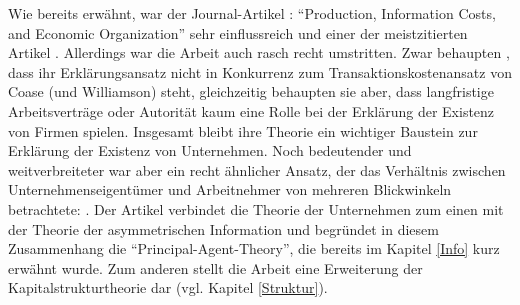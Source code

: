 Wie bereits erwähnt, war der Journal-Artikel \textcite{Alchian1972}: "`Production, Information Costs, and Economic Organization"' sehr einflussreich und einer der meistzitierten Artikel \parencite[S. 192]{Kim2006}. Allerdings war die Arbeit auch rasch recht umstritten. Zwar behaupten \textcite[S. 783]{Alchian1972}, dass ihr Erklärungsansatz nicht in Konkurrenz zum Transaktionskostenansatz von Coase (und Williamson) steht, gleichzeitig behaupten sie aber, dass langfristige Arbeitsverträge \parencite[S. 784]{Alchian1972} oder Autorität kaum eine Rolle bei der Erklärung der Existenz von Firmen spielen. Insgesamt bleibt ihre Theorie ein wichtiger Baustein zur Erklärung der Existenz von Unternehmen. Noch bedeutender und weitverbreiteter war aber ein recht ähnlicher Ansatz, der das Verhältnis zwischen Unternehmenseigentümer und Arbeitnehmer von mehreren Blickwinkeln betrachtete: \textcite{Jensen1976}. Der Artikel verbindet die Theorie der Unternehmen zum einen mit der Theorie der asymmetrischen Information und begründet in diesem Zusammenhang die "`Principal-Agent-Theory"', die bereits im Kapitel \ref{Info} kurz erwähnt wurde. Zum anderen stellt die Arbeit eine Erweiterung der Kapitalstrukturtheorie dar (vgl. Kapitel \ref{Struktur}).

